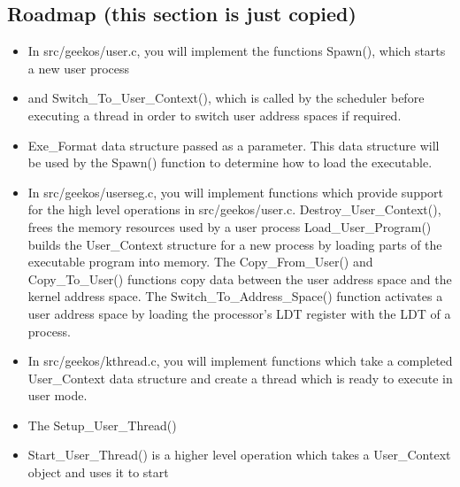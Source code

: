 \subsection{Roadmap (this section is just copied)}
\begin{itemize}
  \item In src/geekos/user.c, you will implement the functions Spawn(), which starts a new user process
  \item and Switch\_To\_User\_Context(), 
		which is called by the scheduler before executing a thread in order to switch user address spaces if required.
  \item Exe\_Format data structure passed as a parameter. 
  		This data structure will be used by the Spawn() function to determine how to load the executable.
  \item In src/geekos/userseg.c, 
   		you will implement functions which provide support for the high level operations in src/geekos/user.c.
   		\subitem Destroy\_User\_Context(), frees the memory resources used by a user process
   		\subitem Load\_User\_Program() builds the User\_Context structure for a new process by loading parts of the executable program into memory.
   		\subitem The Copy\_From\_User() and Copy\_To\_User() functions copy data between the user address space and the kernel address space. 
   		\subitem The Switch\_To\_Address\_Space() function activates a user address space by loading the processor's LDT register with the LDT of a process.
   \item In src/geekos/kthread.c, you will implement functions which take a completed User\_Context data structure and create a thread which is ready to execute in user mode. 
   \item The Setup\_User\_Thread()
   \item Start\_User\_Thread() is a higher level operation which takes a User\_Context object and uses it to start
\end{itemize}

